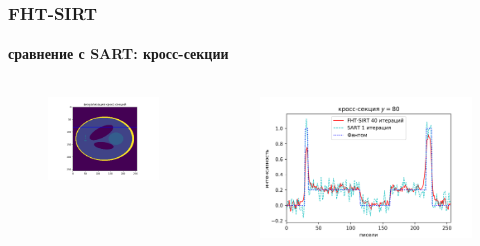\documentclass[12pt]{beamer}
\begin{document}
\begin{frame}
\frametitle{FHT-SIRT}
\framesubtitle{сравнение с SART: кросс-секции}
\begin{columns}[T,onlytextwidth]
  \hspace*{-1cm}
  \begin{column}{0.2\textwidth}
    \begin{figure}
      \centering
      \vspace{1.5cm}
      \includegraphics[width=1.5\textwidth]{cs_80_viz}
    \end{figure}
  \end{column}
  \begin{column}{0.8\textwidth}
    \begin{figure}
      \centering
      \vspace{-1cm}
      \includegraphics[width=1.2\textwidth]{cs_80}
    \end{figure}
  \end{column}
\end{columns}
\end{frame}
\end{document}
